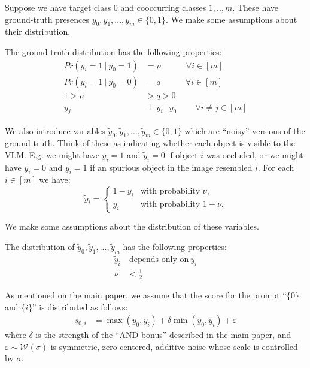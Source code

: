 Suppose we have target class $0$ and cooccurring classes $1,..,m$. These have ground-truth presences $y_0, y_1,...,y_m \in \{0,1\}$. We make some assumptions about their distribution.

\begin{assumption}
\label{assumption:assumption1}
The ground-truth distribution has the following properties:
\begin{align}
Pr(y_i = 1 \ |\  y_0 = 1) &= \rho \qquad\quad \forall i \in [m]\\
Pr(y_i = 1\ |\ y_0 = 0) &= q \qquad\quad \forall i \in [m]\\
1 > \rho &> q > 0\\
y_j &\perp y_i\ |\ y_0\qquad\!\!\!\!\!\!\!\ \forall i \neq j \in [m]
\end{align}
\end{assumption}

We also introduce variables $\tilde{y}_0, \tilde{y}_1,...,\tilde{y}_m \in \{0,1\}$ which are ``noisy'' versions of the ground-truth. Think of these as indicating whether each object is visible to the VLM. E.g. we might have $y_i = 1$ and $\tilde{y}_i = 0$ if object $i$ was occluded, or we might have $y_i = 0$ and $\tilde{y}_i = 1$ if an spurious object in the image resembled $i$. For each $i \in [m]$ we have:
\[
\tilde{y}_i = 
\begin{cases} 
1 - y_i & \text{with probability } \nu, \\
y_i & \text{with probability } 1 - \nu.
\end{cases}
\]

We make some assumptions about the distribution of these variables.

\begin{assumption}
\label{assumption:assumption2}
The distribution of $\tilde{y}_0, \tilde{y}_1,...,\tilde{y}_m$ has the following properties:
\begin{align}
\tilde{y}_i & \ \textrm{depends only on}\ y_i\\
\nu &< \frac{1}{2}
\end{align}
\end{assumption}

As mentioned on the main paper, we assume that the score for the prompt ``$\{0\}$ and $\{i\}$'' is distributed as follows:
\begin{align}
s_{0,i} &= \max(\tilde{y}_0, \tilde{y}_i) + \delta \min(\tilde{y}_0, \tilde{y}_i) + \varepsilon
\end{align}
where $\delta$ is the strength of the ``AND-bonus'' described in the main paper, and $\varepsilon \sim \mathcal{W}(\sigma)$ is symmetric, zero-centered, additive noise whose scale is controlled by $\sigma$.\\

